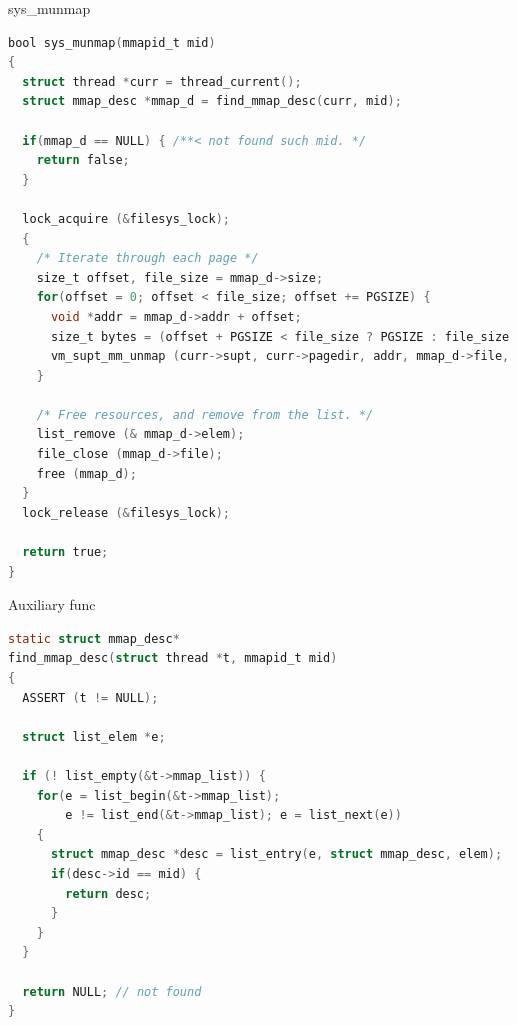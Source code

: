 \documentclass[10pt]{beamer}
\begin{document}
\begin{frame}[fragile]{sys\_munmap}
\begin{lstlisting}[language=C]
bool sys_munmap(mmapid_t mid)
{
  struct thread *curr = thread_current();
  struct mmap_desc *mmap_d = find_mmap_desc(curr, mid);

  if(mmap_d == NULL) { /**< not found such mid. */
    return false; 
  }

  lock_acquire (&filesys_lock);
  {
    /* Iterate through each page */
    size_t offset, file_size = mmap_d->size;
    for(offset = 0; offset < file_size; offset += PGSIZE) {
      void *addr = mmap_d->addr + offset;
      size_t bytes = (offset + PGSIZE < file_size ? PGSIZE : file_size - offset);
      vm_supt_mm_unmap (curr->supt, curr->pagedir, addr, mmap_d->file, offset, bytes);
    }

    /* Free resources, and remove from the list. */
    list_remove (& mmap_d->elem);
    file_close (mmap_d->file);
    free (mmap_d);
  }
  lock_release (&filesys_lock);

  return true;
}
\end{lstlisting}
\end{frame}
\begin{frame}[fragile]{Auxiliary func}
\begin{lstlisting}[language=C]
static struct mmap_desc*
find_mmap_desc(struct thread *t, mmapid_t mid)
{
  ASSERT (t != NULL);

  struct list_elem *e;

  if (! list_empty(&t->mmap_list)) {
    for(e = list_begin(&t->mmap_list);
        e != list_end(&t->mmap_list); e = list_next(e))
    {
      struct mmap_desc *desc = list_entry(e, struct mmap_desc, elem);
      if(desc->id == mid) {
        return desc;
      }
    }
  }

  return NULL; // not found
}
\end{lstlisting}
\end{frame}
\end{document}
